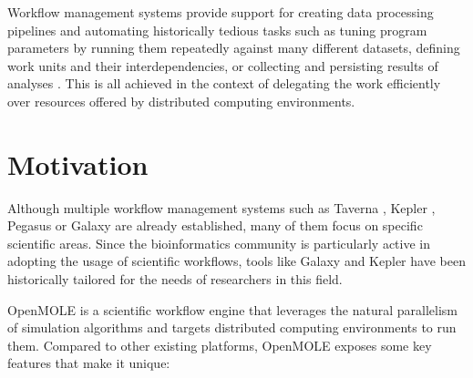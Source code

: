 \documentclass[11pt,a4paper]{report}
\begin{document}
Workflow management systems provide support for creating data processing pipelines and automating historically tedious tasks such as tuning program parameters by running them repeatedly against many different datasets, defining work units and their interdependencies, or collecting and persisting results of analyses \cite{Goble2009, Taylor2007}. This is all achieved in the context of delegating the work efficiently over resources offered by distributed computing environments.

\section{Motivation}

Although multiple workflow management systems such as Taverna \cite{Taverna}, Kepler \cite{Kepler}, Pegasus \cite{Pegasus} or Galaxy \cite{Galaxy} are already established, many of them focus on specific scientific areas. Since the bioinformatics community is particularly active in adopting the usage of scientific workflows, tools like Galaxy and Kepler have been historically tailored for the needs of researchers in this field.

OpenMOLE \cite{Reuillon2013} is a scientific workflow engine that leverages the natural parallelism of simulation algorithms and targets distributed computing environments to run them. Compared to other existing platforms, OpenMOLE exposes some key features that make it unique:
\end{document}
